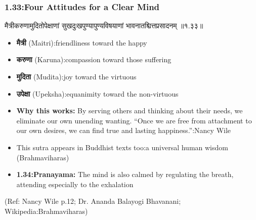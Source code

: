 \begin{frame}[fragile]\frametitle{1.33:Four Attitudes for a Clear Mind}

\begin{sanskrit}
मैत्रीकरुणामुदितोपेक्षाणां सुखदुःखपुण्यापुण्यविषयाणां भावनातश्चित्तप्रसादनम् ॥१.३३॥
\end{sanskrit}

\begin{itemize}
\item \textbf{मैत्री} (Maitri):friendliness toward the happy
\item \textbf{करुणा} (Karuna):compassion toward those suffering
\item \textbf{मुदिता} (Mudita):joy toward the virtuous
\item \textbf{उपेक्षा} (Upeksha):equanimity toward the non-virtuous
\end{itemize}

\vspace{2mm}
\begin{itemize}
\item \textbf{Why this works:} By serving others and thinking about their needs, we eliminate our own unending wanting. ``Once we are free from attachment to our own desires, we can find true and lasting happiness.'':Nancy Wile
\item This sutra appears in Buddhist texts too:a universal human wisdom (Brahmaviharas)
\item \textbf{1.34:Pranayama:} The mind is also calmed by regulating the breath, attending especially to the exhalation
\end{itemize}

\tiny{(Ref: Nancy Wile p.12; Dr. Ananda Balayogi Bhavanani; Wikipedia:Brahmaviharas)}

\end{frame}

